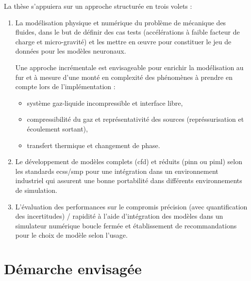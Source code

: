 \documentclass[12pt]{article}
\begin{document}
	La thèse s’appuiera sur un approche structurée en trois volets :
	\begin{enumerate}
		\item La modélisation physique et numérique du problème de mécanique des fluides, dans le but de définir des cas tests (accélérations à faible facteur de charge et micro-gravité) et les mettre en œuvre pour constituer le jeu de données pour les modèles neuronaux.
		
		Une approche incrémentale est envisageable pour enrichir la modélisation au fur et à mesure d'une monté en complexité des phénomènes à prendre en compte lors de l'implémentation :
		\begin{itemize}
			\item système gaz-liquide incompressible et interface libre,
			\item compressibilité du gaz et représentativité des sources (représsurisation et écoulement sortant),
			\item transfert thermique et changement de phase.
		\end{itemize}
		
		\item Le développement de modèles complets (\acrshort{cfd}) et réduits (\gls{pinn} ou \acrshort{piml}) selon les standards \acrshort{ecss}/\acrshort{smp} pour une intégration dans un environnement industriel qui assurent une bonne portabilité dans différents environnements de simulation.
		
		\item L'évaluation des performances sur le compromis précision (avec quantification des incertitudes) / rapidité à l'aide d'intégration des modèles dans un simulateur numérique boucle fermée et établissement de recommandations pour le choix de modèle selon l'usage.	
		
	\end{enumerate}
	
	\section*{Démarche envisagée}
	
\end{document}
